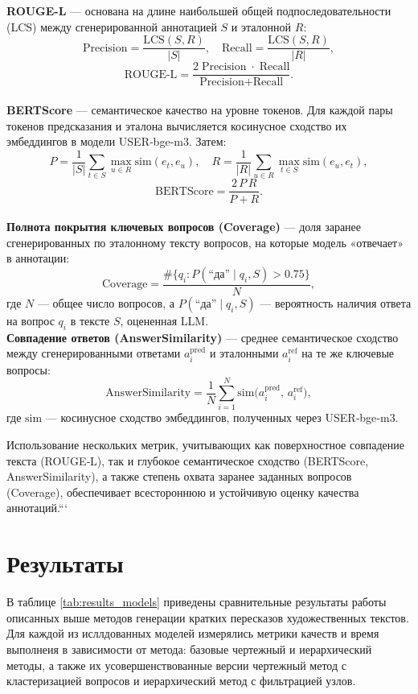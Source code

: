 \documentclass{article}
\theoremstyle{definition}
\theoremstyle{plain}
\begin{document}
\textbf{ROUGE-L} — основана на длине наибольшей общей подпоследовательности (LCS) между сгенерированной аннотацией $S$ и эталонной $R$:
    \[
      \text{Precision} = \frac{\mathrm{LCS}(S,R)}{|S|},\quad
      \text{Recall} = \frac{\mathrm{LCS}(S,R)}{|R|},
    \]
    \[
      \text{ROUGE‑L} = \frac{2\;\text{Precision}\;\cdot\;\text{Recall}}{\text{Precision} + \text{Recall}}.
    \]
\\ \textbf{BERTScore} — семантическое качество на уровне токенов. Для каждой пары токенов предсказания и эталона вычисляется косинусное сходство их эмбеддингов в модели USER‑bge‑m3. Затем:
    \[
      P = \frac{1}{|S|}\sum_{t\in S}\max_{u\in R}\!\mathrm{sim}(e_t, e_u),\quad
      R = \frac{1}{|R|}\sum_{u\in R}\max_{t\in S}\!\mathrm{sim}(e_u, e_t),
    \]
    \[
      \text{BERTScore} = \frac{2\,P\,R}{P+R}.
    \]
\\ \textbf{Полнота покрытия ключевых вопросов (Coverage)} — доля заранее сгенерированных по эталонному тексту вопросов, на которые модель «отвечает» в аннотации:
    \[
      \text{Coverage} = \frac{\#\{q_i\colon P(\text{“да”}\mid q_i,S)\!>\!0.75\}}{N},
    \]
    где $N$ — общее число вопросов, а $P(\text{“да”}\mid q_i,S)$ — вероятность наличия ответа на вопрос $q_i$ в тексте $S$, оцененная LLM.
\\ \textbf{Совпадение ответов (AnswerSimilarity)} — среднее семантическое сходство между сгенерированными ответами $a_i^{\text{pred}}$ и эталонными $a_i^{\text{ref}}$ на те же ключевые вопросы:
    \[
      \text{AnswerSimilarity}
      = \frac{1}{N}\sum_{i=1}^N \mathrm{sim}\bigl(a_i^{\text{pred}},\,a_i^{\text{ref}}\bigr),
    \]
    где $\mathrm{sim}$ — косинусное сходство эмбеддингов, полученных через USER‑bge‑m3.


Использование нескольких метрик, учитывающих как поверхностное совпадение текста (ROUGE‑L), так и глубокое семантическое сходство (BERTScore, AnswerSimilarity), а также степень охвата заранее заданных вопросов (Coverage), обеспечивает всестороннюю и устойчивую оценку качества аннотаций.```



\section*{Результаты}

В таблице \ref{tab:results_models} приведены сравнительные результаты работы описанных выше методов генерации кратких пересказов художественных текстов.
Для каждой из исллдованных моделей измерялись метрики качеств  и время выполнеия в зависимости от метода: базовые чертежный и иерархический методы, а также их усовершенствованные версии \- 
чертежный метод с кластеризацией вопросов и иерархический метод с фильтрацией узлов.
\end{document}
